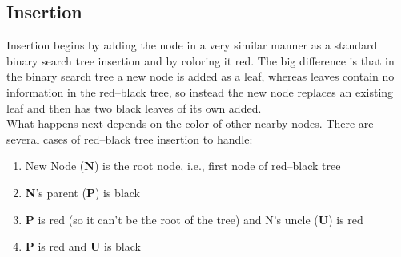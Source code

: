 \documentclass{article}[10pt]
\begin{document}
\newpage
\subsection{Insertion}
Insertion begins by adding the node in a very similar manner as a standard binary search tree insertion and by coloring it red. The big difference is that in the binary search tree a new node is added as a leaf, whereas leaves contain no information in the red–black tree, so instead the new node replaces an existing leaf and then has two black leaves of its own added. \\
What happens next depends on the color of other nearby nodes. There are several cases of red–black tree insertion to handle:
\begin{enumerate}
    \item New Node (\textbf{N}) is the root node, i.e., first node of red–black tree
    \item \textbf{N}'s parent (\textbf{P}) is black
    \item \textbf{P} is red (so it can't be the root of the tree) and N's uncle (\textbf{U}) is red
    \item \textbf{P} is red and \textbf{U} is black
\end{enumerate}
\end{document}
